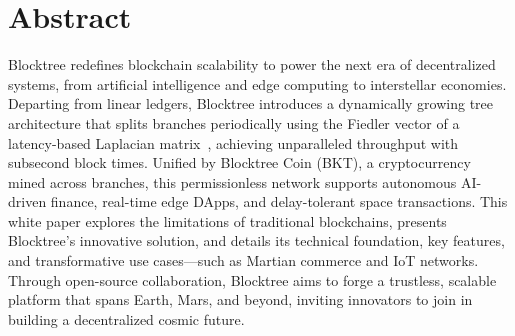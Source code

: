 \section*{Abstract}
Blocktree redefines blockchain scalability to power the next era of decentralized systems, from artificial intelligence and edge computing to interstellar economies. Departing from linear ledgers, Blocktree introduces a dynamically growing tree architecture that splits branches periodically using the Fiedler vector of a latency-based Laplacian matrix~\cite{ng2001spectral}, achieving unparalleled throughput with subsecond block times. Unified by Blocktree Coin (BKT), a cryptocurrency mined across branches, this permissionless network supports autonomous AI-driven finance, real-time edge DApps, and delay-tolerant space transactions. This white paper explores the limitations of traditional blockchains, presents Blocktree’s innovative solution, and details its technical foundation, key features, and transformative use cases—such as Martian commerce and IoT networks. Through open-source collaboration, Blocktree aims to forge a trustless, scalable platform that spans Earth, Mars, and beyond, inviting innovators to join in building a decentralized cosmic future.